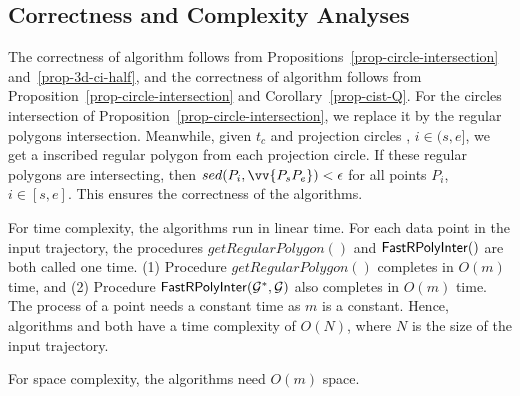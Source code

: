 \subsection{Correctness and Complexity Analyses}

The correctness of algorithm \cist follows from Propositions~\ref{prop-circle-intersection} and~\ref{prop-3d-ci-half}, and the correctness of algorithm \cista follows from Proposition~\ref{prop-circle-intersection} and Corollary~\ref{prop-cist-Q}. For the circles intersection of Proposition~\ref{prop-circle-intersection}, we replace it by the regular polygons intersection.
Meanwhile, given $t_c$ and projection circles , $i \in (s, e]$, we get a inscribed regular polygon from each projection circle.
If these regular polygons are intersecting, then $sed(P_i, \vv{P_sP_e})<\epsilon$ for all points $P_i$, $i \in [s,e]$.
This ensures the correctness of the algorithms.

For time complexity, the algorithms run in linear time.
For each data point in the input trajectory, the procedures $getRegularPolygon()$ and ${\mathsf{FastRPolyInter}}()$ are both called one time.
(1) Procedure $getRegularPolygon()$ completes in $O(m)$ time, and
(2) Procedure ${\mathsf{FastRPolyInter}}(\mathcal{G}^*, \mathcal{G})$ also completes in $O(m)$ time.
The process of a point needs a constant time as $m$ is a constant.
Hence, algorithms \cist and \cista both have a time complexity of $O(N)$, where $N$ is the size of the input trajectory.

{For space complexity, the algorithms need $O(m)$ space.}



